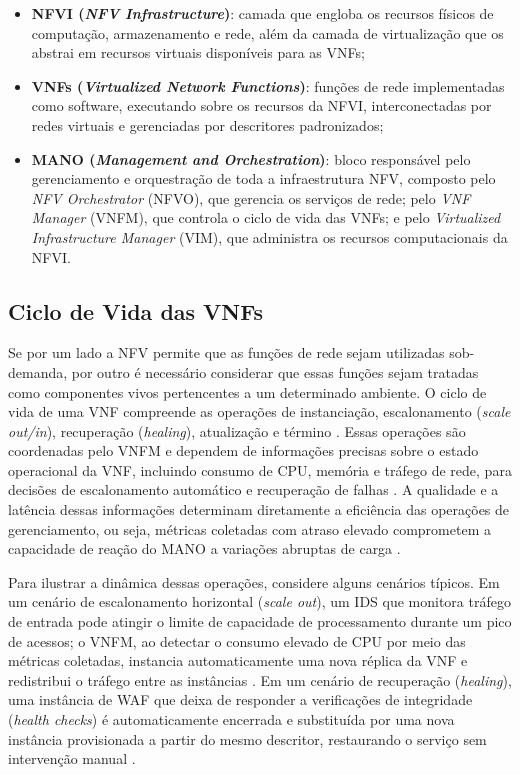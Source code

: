 \begin{itemize}
    \item \textbf{NFVI (\textit{NFV Infrastructure})}: camada que engloba os recursos físicos de computação, armazenamento e rede, além da camada de virtualização que os abstrai em recursos virtuais disponíveis para as VNFs;
    \item \textbf{VNFs (\textit{Virtualized Network Functions})}: funções de rede implementadas como software, executando sobre os recursos da NFVI, interconectadas por redes virtuais e gerenciadas por descritores padronizados;
    \item \textbf{MANO (\textit{Management and Orchestration})}: bloco responsável pelo gerenciamento e orquestração de toda a infraestrutura NFV, composto pelo \textit{NFV Orchestrator} (NFVO), que gerencia os serviços de rede; pelo \textit{VNF Manager} (VNFM), que controla o ciclo de vida das VNFs; e pelo \textit{Virtualized Infrastructure Manager} (VIM), que administra os recursos computacionais da NFVI.
\end{itemize}

\subsection{Ciclo de Vida das VNFs}

Se por um lado a NFV permite que as funções de rede sejam utilizadas sob-demanda, por outro é necessário considerar que essas funções sejam tratadas como componentes vivos pertencentes a um determinado ambiente. O ciclo de vida de uma VNF compreende as operações de instanciação, escalonamento (\textit{scale out/in}), recuperação (\textit{healing}), atualização e término \cite{repec:wly:intnem:v:31:y:2021:i:5:n:e2068}. Essas operações são coordenadas pelo VNFM e dependem de informações precisas sobre o estado operacional da VNF, incluindo consumo de CPU, memória e tráfego de rede, para decisões de escalonamento automático e recuperação de falhas \cite{10.23919}. A qualidade e a latência dessas informações determinam diretamente a eficiência das operações de gerenciamento, ou seja, métricas coletadas com atraso elevado comprometem a capacidade de reação do MANO a variações abruptas de carga \cite{oliveira_observability_2026}.

Para ilustrar a dinâmica dessas operações, considere alguns cenários típicos. Em um cenário de escalonamento horizontal (\textit{scale out}), um IDS que monitora tráfego de entrada pode atingir o limite de capacidade de processamento durante um pico de acessos; o VNFM, ao detectar o consumo elevado de CPU por meio das métricas coletadas, instancia automaticamente uma nova réplica da VNF e redistribui o tráfego entre as instâncias \cite{NIKBAZM2022102632, repec:wly:intnem:v:31:y:2021:i:5:n:e2068}. Em um cenário de recuperação (\textit{healing}), uma instância de WAF que deixa de responder a verificações de integridade (\textit{health checks}) é automaticamente encerrada e substituída por uma nova instância provisionada a partir do mesmo descritor, restaurando o serviço sem intervenção manual \cite{repec:wly:intnem:v:31:y:2021:i:5:n:e2068, mijumbi2016}.

